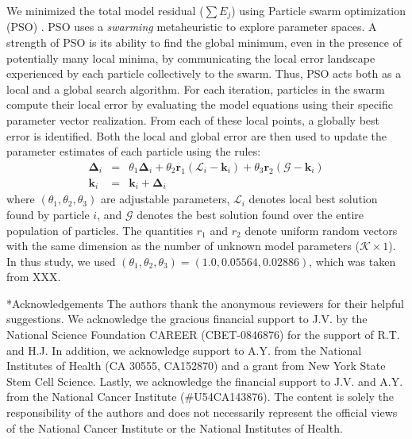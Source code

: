\documentclass[12pt]{article}
\makeatletter
\renewcommand\section{\@startsection
	{subsection}{2}{0mm}
	{-0.2in}
	{0.05\baselineskip}
	{\normalfont\large\bfseries}}
\makeatother
\begin{document}
We minimized the total model residual ($\sum{E_{j}}$) using Particle swarm optimization (PSO) \citep{PSO}.
PSO uses a \textit{swarming} metaheuristic to explore parameter spaces. 
A strength of PSO is its ability to find the global minimum, even in the presence of potentially many local minima, by communicating the local
error landscape experienced by each particle collectively to the swarm. Thus, PSO acts both as a local and a global search algorithm. 
For each iteration, particles in the swarm compute their local error by evaluating the model equations using their specific parameter vector realization.
From each of these local points, a globally best error is identified. Both the local and global error 
are then used to update the parameter estimates of each particle using the rules:
\begin{eqnarray}
	\mathbf{\Delta}_{i} &=&\theta_{1}\mathbf{\Delta}_{i} + \theta_{2}\mathbf{r}_{1}\left(\mathcal{L}_{i} - \mathbf{k}_{i}\right) + \theta_{3}\mathbf{r}_{2}\left(\mathcal{G} - \mathbf{k}_{i}\right) \\
	\mathbf{k}_{i} &=& \mathbf{k}_{i} + \mathbf{\Delta}_{i}
\end{eqnarray}where $\left(\theta_{1},\theta_{2},\theta_{3}\right)$ are adjustable parameters, $\mathcal{L}_{i}$ denotes local best solution found by particle $i$, and
$\mathcal{G}$ denotes the best solution found over the entire population of particles. The quantities $r_{1}$ and $r_{2}$ denote uniform random vectors with the same dimension as the number of unknown model
parameters ($\mathcal{K}\times{1}$). In thus study, we used $\left(\theta_{1},\theta_{2},\theta_{3}\right) = \left(1.0, 0.05564, 0.02886\right)$, which was taken from XXX. 

\section*{Acknowledgements}
The authors thank the anonymous reviewers for their helpful suggestions. 
We acknowledge the gracious financial support to J.V. by the National Science Foundation CAREER (CBET-0846876) for the support of R.T. and H.J.
In addition, we acknowledge support to A.Y. from the National Institutes of Health (CA 30555, CA152870) 
and a grant from New York State Stem Cell Science.  Lastly, we acknowledge the financial support to J.V. and A.Y. 
from the National Cancer Institute (\#U54CA143876). The content is solely the responsibility of the authors and does not necessarily 
represent the official views of the National Cancer Institute or the National Institutes of Health.

\clearpage
%
%



\clearpage

\renewcommand\thefigure{S\arabic{figure}}
\renewcommand\thetable{T\arabic{table}}
\renewcommand\thepage{S-\arabic{page}}
\renewcommand\theequation{S\arabic{equation}}

\setcounter{equation}{0}
\setcounter{table}{0}
\setcounter{figure}{0}
\setcounter{page}{1}
\end{document}
